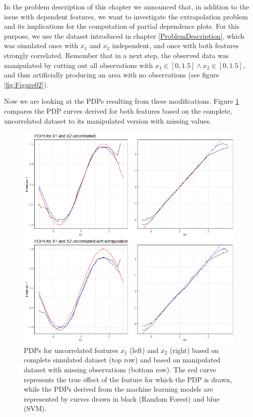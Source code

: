 \documentclass[]{krantz}
\begin{document}
In the problem description of this chapter we announced that, in
addition to the issue with dependent features, we want to investigate
the extrapolation problem and its implications for the computation of
partial dependence plots. For this purpose, we use the dataset
introduced in chapter \ref{ProblemDescription}, which was simulated once
with \(x_1\) and \(x_2\) independent, and once with both features
strongly correlated. Remember that in a next step, the observed data was
manipulated by cutting out all observations with
\(x_1 \in [0, 1.5] \wedge x_2 \in [0, 1.5]\), and thus artificially
producing an area with no observations (see figure \ref{fig:Figure02}).

Now we are looking at the PDPs resulting from these modifications.
Figure \ref{fig:Figure25} compares the PDP curves derived for both
features based on the complete, uncorrelated dataset to its manipulated
version with missing values.

\begin{figure}

\includegraphics[width=0.9\linewidth]{images/VK_PDP_25_Extrapol_uncor} \hfill{}

\caption{PDPs for uncorrelated features $x_1$ (left) and $x_2$ (right) based on complete simulated dataset (top row) and based on manipulated dataset with missing observations (bottom row). The red curve represents the true effect of the feature for which the PDP is drawn, while the PDPs derived from the machine learning models are represented by curves drawn in black (Random Forest) and blue (SVM).}\label{fig:Figure25}
\end{figure}
\end{document}
